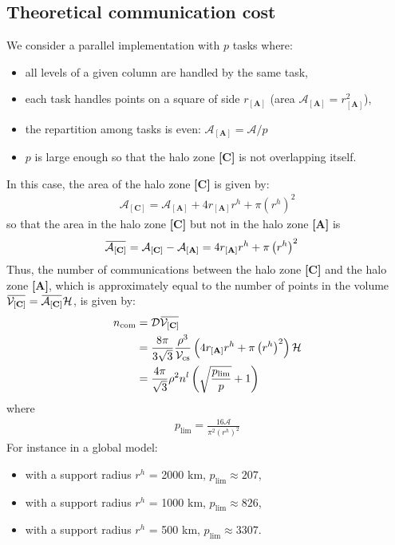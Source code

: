 \documentclass[12pt]{scrartcl}
\newcommand{\overbar}[1]{\mkern 1.5mu\overline{\mkern-1.5mu#1\mkern-1.5mu}\mkern 1.5mu}
\begin{document}
\subsection{Theoretical communication cost}
We consider a parallel implementation with $p$ tasks where:
\begin{itemize}
\item all levels of a given column are handled by the same task,
\item each task handles points on a square of side $r_\mathbf{[A]}$ (area $\mathcal{A}_\mathbf{[A]} = r_\mathbf{[A]}^2$),
\item the repartition among tasks is even: $\mathcal{A}_\mathbf{[A]} = \mathcal{A}/p$
\item $p$ is large enough so that the halo zone \textbf{[C]} is not overlapping itself.
\end{itemize}
In this case, the area of the halo zone \textbf{[C]} is given by:
\begin{align}
\mathcal{A}_\mathbf{[C]} = \mathcal{A}_\mathbf{[A]} + 4 r_\mathbf{[A]} r^h + \pi\left(r^h\right)^2
\end{align}
so that the area in the halo zone \textbf{[C]} but not in the halo zone \textbf{[A]} is
\begin{align}
\overbar{\mathcal{A}_\mathbf{[C]}} & = \mathcal{A}_\mathbf{[C]} - \mathcal{A}_\mathbf{[A]} = 4 r_\mathbf{[A]} r^h + \pi\left(r^h\right)^2
\end{align}
Thus, the number of communications between the halo zone \textbf{[C]} and the halo zone \textbf{[A]}, which is approximately equal to the number of points in the volume $\overbar{\mathcal{V}_\mathbf{[C]}} = \overbar{\mathcal{A}_\mathbf{[C]}} \mathcal{H}$, is given by:
\begin{align}
\label{eq:ncom}
n_\mathrm{com} & = \mathcal{D} \overbar{\mathcal{V}_\mathbf{[C]}} \nonumber \\
& = \frac{8\pi}{3\sqrt{3}} \frac{\rho^3}{\mathcal{V}_\mathrm{cs}} \left(4 r_\mathbf{[A]} r^h + \pi\left(r^h\right)^2\right) \mathcal{H} \nonumber \\
& =  \frac{4\pi}{\sqrt{3}} \rho^2 n^l \left(\sqrt{\frac{p_\mathrm{lim}}{p}} +1 \right)
\end{align}
where
\begin{align}
p_\mathrm{lim} = \frac{16 \mathcal{A}}{\pi^2 \left(r^h\right)^2}
\end{align}
For instance in a global model:
\begin{itemize}
\item with a support radius $r^h$ = 2000 km, $p_\mathrm{lim} \approx 207$,
\item with a support radius $r^h$ = 1000 km, $p_\mathrm{lim} \approx 826$,
\item with a support radius $r^h$ = 500 km, $p_\mathrm{lim} \approx 3307$.
\end{itemize}
\end{document}
